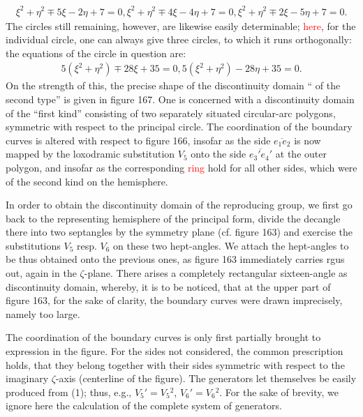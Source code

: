 \begin{align}
\xi^2+\eta^2\mp 5\xi-2\eta+7=0, \xi^2+\eta^2\mp 4\xi-4\eta+7=0, \xi^2+\eta^2\mp 2\xi-5\eta+7=0.
\end{align}
The circles still remaining, however, are likewise easily determinable; \textcolor{red}{here}, for the individual circle, one can always give three circles, to which it runs orthogonally: the equations of the circle in question are:
\begin{align}
5(\xi^2+\eta^2)\mp 28\xi+35=0, 5(\xi^2+\eta^2)-28\eta+35=0.
\end{align}
On the strength of this, the precise shape of the discontinuity domain “ of the second type” is given in figure 167. One is concerned with a discontinuity domain of the “first kind” consisting of two separately situated circular-arc polygons, symmetric with respect to the principal circle. The coordination of the boundary curves is altered with respect to figure 166, insofar as the side $\overline{e_1e_2}$ is now mapped by the loxodramic substitution $V_5$ onto the side $\overline{e_3'e_4'}$ at the outer polygon, and insofar as the corresponding \textcolor{red}{ring} hold for all other sides, which were of the second kind on the hemisphere.

In order to obtain the discontinuity domain of the reproducing group, we first go back to the representing hemisphere of the principal form, divide the decangle there into two septangles by the symmetry plane  (cf. figure 163) and exercise the substitutions $V_5$ resp. $V_6$ on these two hept-angles. We attach the hept-angles to be thus obtained onto the previous ones, as figure 163 immediately carries rgus out, again in the $\zeta$-plane. There arises a completely rectangular sixteen-angle as discontinuity domain, whereby, it is to be noticed, that at the upper part of figure 163, for the sake of clarity, the boundary curves were drawn imprecisely, namely too large.

The coordination of the boundary curves is only first partially brought to expression in the figure. For the sides not considered, the common prescription holds, that they belong together with their sides symmetric with respect to the imaginary $\zeta$-axis (centerline of the figure). The generators let themselves be easily produced from (1); thus, e.g., $V_5\phantom{}'=V_5\phantom{}^2$, $V_6\phantom{}'=V_6\phantom{}^2$. For the sake of brevity, we ignore here the calculation of the complete system of generators.

